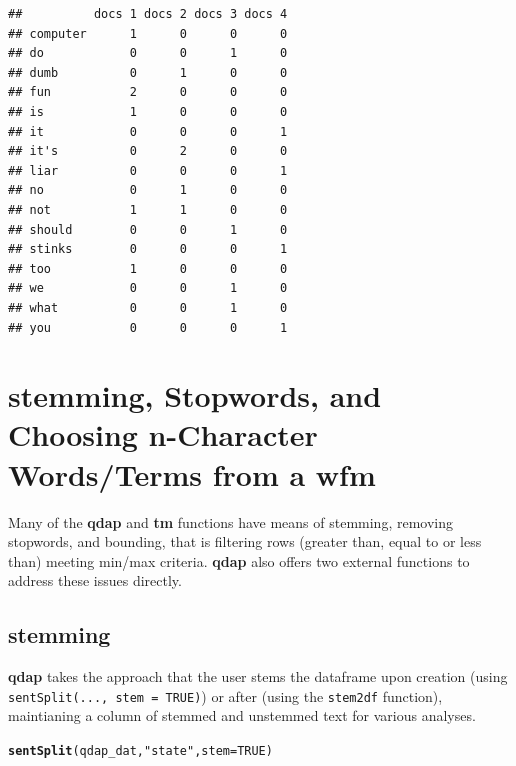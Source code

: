 \documentclass{article}\usepackage[]{graphicx}\usepackage[]{color}
\makeatletter
\newcommand{\hlnum}[1]{\textcolor[rgb]{0.686,0.059,0.569}{#1}}%
\newcommand{\hlstr}[1]{\textcolor[rgb]{0.192,0.494,0.8}{#1}}%
\newcommand{\hlstd}[1]{\textcolor[rgb]{0.345,0.345,0.345}{#1}}%
\newcommand{\hlkwc}[1]{\textcolor[rgb]{0.333,0.667,0.333}{#1}}%
\newcommand{\hlkwd}[1]{\textcolor[rgb]{0.737,0.353,0.396}{\textbf{#1}}}%
\newenvironment{kframe}{%
 \def\at@end@of@kframe{}%
 \ifinner\ifhmode%
  \def\at@end@of@kframe{\end{minipage}}%
  \begin{minipage}{\columnwidth}%
 \fi\fi%
 \def\FrameCommand##1{\hskip\@totalleftmargin \hskip-\fboxsep
 \colorbox{shadecolor}{##1}\hskip-\fboxsep
     \hskip-\linewidth \hskip-\@totalleftmargin \hskip\columnwidth}%
 \MakeFramed {\advance\hsize-\width
   \@totalleftmargin\z@ \linewidth\hsize
   \@setminipage}}%
 {\par\unskip\endMakeFramed%
 \at@end@of@kframe}
\newenvironment{knitrout}{}{} %
\makeatother
\begin{document}
\begin{knitrout}
\color{fgcolor}\begin{kframe}
\begin{verbatim}
##          docs 1 docs 2 docs 3 docs 4
## computer      1      0      0      0
## do            0      0      1      0
## dumb          0      1      0      0
## fun           2      0      0      0
## is            1      0      0      0
## it            0      0      0      1
## it's          0      2      0      0
## liar          0      0      0      1
## no            0      1      0      0
## not           1      1      0      0
## should        0      0      1      0
## stinks        0      0      0      1
## too           1      0      0      0
## we            0      0      1      0
## what          0      0      1      0
## you           0      0      0      1
\end{verbatim}
\end{kframe}
\end{knitrout}


\section{stemming, Stopwords, and Choosing n-Character Words/Terms from a wfm}


\hspace{.4cm} Many of the \textbf{qdap} and \textbf{tm} functions have means of stemming, removing stopwords, and bounding, that is filtering rows (greater than, equal to or less than) meeting min/max criteria.  \textbf{qdap} also offers two external functions to address these issues directly.  


\subsection{stemming}

\hspace{.4cm} \textbf{qdap} takes the approach that the user stems the dataframe upon creation (using \texttt{sentSplit(..., stem = TRUE)}) or after (using the \texttt{stem2df} function), maintianing a column of stemmed and unstemmed text for various analyses.

\begin{knitrout}
\color{fgcolor}\begin{kframe}
\begin{alltt}
\hlkwd{sentSplit}\hlstd{(qdap_dat,} \hlstr{"state"}\hlstd{,} \hlkwc{stem} \hlstd{=} \hlnum{TRUE}\hlstd{)}
\end{alltt}
\end{kframe}
\end{knitrout}
\end{document}
